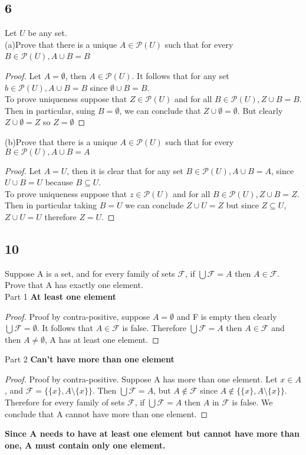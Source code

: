 \documentclass{article}
\begin{document}
\subsection{6}
Let $U$ be any set.$ $\\
(a)Prove that there is a unique $A \in \mathscr{P}(U)$ such that for every $B \in \mathscr{P}(U), A \cup B = B$ $ $\\
\begin{proof}
Let $A=\emptyset$, then $A \in \mathscr{P}(U)$. It follows that for any set $b \in \mathscr{P}(U), A \cup B = B$ since $\emptyset \cup B = B$.$ $\\
To prove uniqueness suppose that $Z \in \mathscr{P}(U)$ and for all $B \in \mathscr{P}(U), Z \cup B = B$. Then in particular, suing $B = \emptyset$, we can conclude that $Z \cup \emptyset = \emptyset$. But clearly $Z \cup \emptyset = Z$ so $Z= \emptyset$
\end{proof}
(b)Prove that there is a unique $A \in \mathscr{P}(U)$ such that for every $B \in \mathscr{P}(U), A \cup B = A$
\begin{proof}
Let $A = U$, then it is clear that for any set $B \in \mathscr{P}(U), A \cup B = A$, since $U\cup B= U$ because $B \subseteq U$. $ $\\
To prove uniqueness suppose that $z \in \mathscr{P}(U)$ and for all $B \in \mathscr{P}(U), Z \cup B = Z$. Then in particular taking $B = U$ we can conclude $Z \cup U = Z$ but since $Z \subseteq U$, $Z \cup U= U$ therefore $Z = U$.
\end{proof}
\newpage
\subsection{10}
Suppose A is a set, and for every family of sets $\mathscr{F}$, if $\bigcup \mathscr{F} = A$ then $A \in \mathscr{F}$. Prove that A has exactly one element.
$ $\\
Part 1 \textbf{At least one element} 
\begin{proof}
Proof by contra-positive, suppose $A = \emptyset$ and F is empty then clearly $\bigcup \mathscr{F} = \emptyset$. It follows that  $A \in \mathscr{F}$ is false. Therefore $\bigcup \mathscr{F} = A$ then $A \in \mathscr{F}$ and then $A \neq \emptyset$, A has at least one element.
\end{proof}
$ $\\
Part 2 \textbf{Can't have more than one element
}
\begin{proof}
Proof by contra-positive. Suppose A has more than one element. Let $x \in A$, and $\mathscr{F} = \{ \{x\}, A \setminus \{x\} \}$. Then $\bigcup \mathscr{F} = A$, but $A \notin \mathscr{F}$ since $A \notin \{ \{x\}, A \setminus \{x\} \}$. Therefore for every family of sets $\mathscr{F}$, if $\bigcup \mathscr{F} = A$ then $A$ in $\mathscr{F}$ is false. We conclude that A cannot have more than one element.
\end{proof}
\textbf{Since A needs to have at least one element but cannot have more than one, A must contain only one element.}
\end{document}
